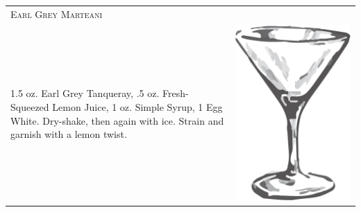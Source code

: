 \documentclass{article}
\begin{document}
\begin{multicols}{2}
\begin{tabular}{p{2in} p{0.5in}}
\multicolumn{2}{p{3in}}{\centering\Huge\textsc{Earl Grey Marteani}}\\ 
  \vspace{-0.1in}1.5 oz. Earl Grey Tanqueray, .5 oz. Fresh-Squeezed Lemon Juice, 1 oz. Simple Syrup, 1 Egg White. Dry-shake, then again with ice. Strain and garnish with a lemon twist. &
  \vspace{-0.1in} \includegraphics{goblet.png}
\end{tabular}


\end{multicols}
\end{document}
